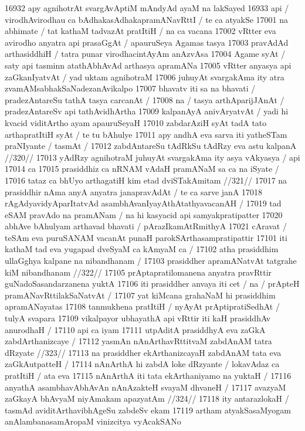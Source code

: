 16932 apy agnihotrAt svargAvAptiM mAndyAd ayaM na lakSayed 
16933 api / virodhAvirodhau ca bAdhakasAdhakapramANavRttI / te ca atyakSe
17001 na abhimate / tat kathaM tadvazAt pratItiH / na ca vacana 
17002 vRtter eva avirodho anyatra api prasaGgAt / apauruSeya Agamas tasya  
17003 pravAdAd arthasiddhiH / tatra punar virodhacintAyAm anAzvAsa
17004 Agame syAt / saty api tasminn atathAbhAvAd arthasya apramANa 
17005 vRtter anyasya api zaGkanIyatvAt / yad uktam agnihotraM  
17006 juhuyAt svargakAma ity atra zvamAMsabhakSaNadezanAvikalpo 
17007 bhavatv iti sa na bhavati / pradezAntareSu tathA tasya carcanAt /  
17008 na / tasya arthAparijJAnAt / pradezAntareSv api tathAvidhArtha  
17009 kalpanAyA anivAryatvAt / yadi hi kvacid viditArtho ayam apauruSeyaH 
17010 zabdarAziH syAt tadA tato arthapratItiH syAt / te tu bAhulye
17011 apy andhA eva sarva iti yatheSTam praNIyante / tasmAt / 
17012 	zabdAntareSu tAdRkSu tAdRzy eva astu kalpanA //320//
17013 yAdRzy agnihotraM juhuyAt svargakAma ity asya vAkyasya / api 
17014 ca
17015 	prasiddhiz ca nRNAM vAdaH pramANaM sa ca na iSyate /  
17016 	tataz ca bhUyo arthagatiH kim etad dviSTakAmitam //321//
17017 na prasiddhir nAma anyA anyatra janapravAdAt / te ca sarve janA  
17018 rAgAdyavidyAparItatvAd asambhAvanIyayAthAtathyavacanAH /
17019 tad eSAM pravAdo na pramANam / na hi kasyacid api samyakpratipatter
17020 abhAve bAhulyam arthavad bhavati / pArazIkamAtRmithyA 
17021 cAravat / teSAm eva puruSANAM vacanAt punaH parokSArthasampratipattir
17101 iti kathaM tad eva yugapad dveSyaM ca kAmyaM ca /
17102 	atha prasiddhim ullaGghya kalpane na nibandhanam / 
17103 	prasiddher apramANatvAt tatgrahe kiM nibandhanam //322// 
17105 prAptapratilomanena anyatra pravRttir guNadoSasandarzanena yuktA  
17106 iti prasiddher anvaya iti cet / na / prApteH pramANavRttilakSaNatvAt /
17107 yat kiMcana grahaNaM hi prasiddhim apramANayatas 
17108 tanmukhena pratItiH / nyAyAt prAptipratiSedhAt / tulyA svapara  
17109 vikalpayor ubhayathA api vRttir iti kaH prasiddhAv anurodhaH / 
17110 api ca iyam
17111 	utpAditA prasiddhyA eva zaGkA zabdArthanizcaye /  
17112 	yasmAn nAnArthavRttitvaM zabdAnAM tatra dRzyate //323//
17113 na prasiddher ekArthanizcayaH zabdAnAM tata eva zaGkAutpatteH / 
17114 nAnArthA hi zabdA loke dRzyante / lokavAdaz ca pratItiH / ata eva
17115 nAnArthA iti tata ekArthaniyamo na yuktaH /  
17116 	anyathA asambhavAbhAvAn nAnAzakteH svayaM dhvaneH / 
17117 	avazyaM zaGkayA bhAvyaM niyAmakam apazyatAm //324//  
17118 ity antarazlokaH / tasmAd aviditArthavibhAgeSu zabdeSv ekam 
17119 artham atyakSasaMyogam anAlambanasamAropaM vinizcitya vyAcakSANo 
